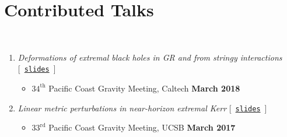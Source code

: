 
\section*{\sc Contributed Talks}~
\vspace{-.2in}

\begin{enumerate}

    \item {\it Deformations of extremal black holes in GR and from stringy interactions}
    [~\href{http://fermionic.me/talk-slides/Stringy%40PCGM.pdf}{{\tt slides}}~]
    \begin{itemize}
     \item[] $34^\mathrm{th}$ Pacific Coast Gravity Meeting, Caltech
       \hfill  {\bf March 2018} 
    \end{itemize}

    \item {\it Linear metric perturbations in near-horizon extremal Kerr}
    [~\href{http://fermionic.me/talk-slides/NHEK%40PCGM.pdf}{{\tt slides}}~]
    \begin{itemize}
     \item[] $33^\mathrm{rd}$ Pacific Coast Gravity Meeting, UCSB
        {\bf March 2017}
    \end{itemize}
    

\end{enumerate}
